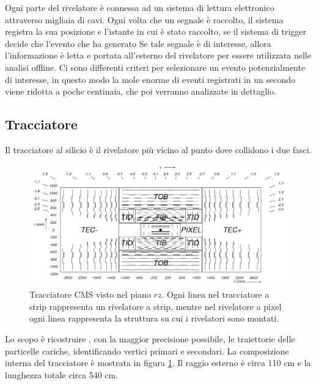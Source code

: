 Ogni parte del rivelatore è connessa ad un sistema di lettura elettronico attraverso migliaia di cavi. Ogni volta che un segnale è raccolto, il sistema registra la sua posizione e l'istante in cui è stato raccolto, se il sistema di trigger decide che l'evento che ha generato Se tale segnale è di interesse, allora l'informazione è letta e portata all'esterno del rivelatore per essere utilizzata nelle analisi offline.
Ci sono differenti criteri per selezionare un evento potenzialmente di interesse, in questo modo la mole enorme di eventi registrati in un secondo viene ridotta a poche centinaia, che poi verranno analizzate in dettaglio.


\subsection{Tracciatore}
Il tracciatore al silicio  è il rivelatore più vicino al punto dove collidono i due fasci. 
\begin{figure}
\centering
\includegraphics[scale=0.35]{Immagini/CMStracker}
\caption{Tracciatore CMS visto nel piano $rz$. Ogni linea nel tracciatore a strip rappresenta un rivelatore a strip, mentre nel rivelatore a pixel ogni linea rappresenta la struttura su cui i rivelatori sono montati.}
\label{CMStracker}
\end{figure}
Lo scopo è ricostruire , con la maggior precisione possibile, le traiettorie delle particelle cariche, identificando vertici primari e secondari. La composizione interna del tracciatore è mostrata in figura \ref{CMStracker}. Il raggio esterno è circa 110 cm e la lunghezza totale circa 540 cm.

